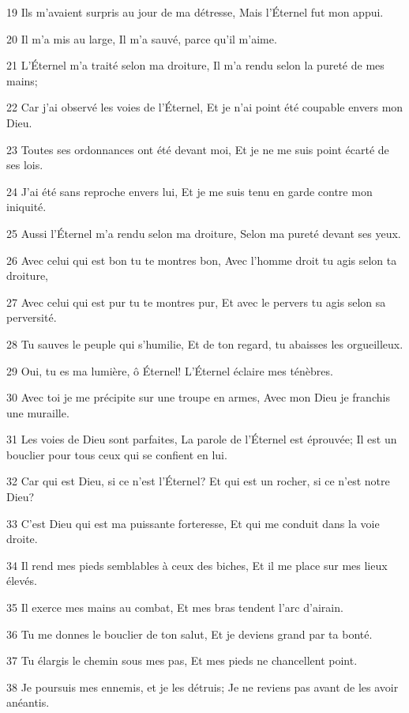 \par 19 Ils m'avaient surpris au jour de ma détresse, Mais l'Éternel fut mon appui.
\par 20 Il m'a mis au large, Il m'a sauvé, parce qu'il m'aime.
\par 21 L'Éternel m'a traité selon ma droiture, Il m'a rendu selon la pureté de mes mains;
\par 22 Car j'ai observé les voies de l'Éternel, Et je n'ai point été coupable envers mon Dieu.
\par 23 Toutes ses ordonnances ont été devant moi, Et je ne me suis point écarté de ses lois.
\par 24 J'ai été sans reproche envers lui, Et je me suis tenu en garde contre mon iniquité.
\par 25 Aussi l'Éternel m'a rendu selon ma droiture, Selon ma pureté devant ses yeux.
\par 26 Avec celui qui est bon tu te montres bon, Avec l'homme droit tu agis selon ta droiture,
\par 27 Avec celui qui est pur tu te montres pur, Et avec le pervers tu agis selon sa perversité.
\par 28 Tu sauves le peuple qui s'humilie, Et de ton regard, tu abaisses les orgueilleux.
\par 29 Oui, tu es ma lumière, ô Éternel! L'Éternel éclaire mes ténèbres.
\par 30 Avec toi je me précipite sur une troupe en armes, Avec mon Dieu je franchis une muraille.
\par 31 Les voies de Dieu sont parfaites, La parole de l'Éternel est éprouvée; Il est un bouclier pour tous ceux qui se confient en lui.
\par 32 Car qui est Dieu, si ce n'est l'Éternel? Et qui est un rocher, si ce n'est notre Dieu?
\par 33 C'est Dieu qui est ma puissante forteresse, Et qui me conduit dans la voie droite.
\par 34 Il rend mes pieds semblables à ceux des biches, Et il me place sur mes lieux élevés.
\par 35 Il exerce mes mains au combat, Et mes bras tendent l'arc d'airain.
\par 36 Tu me donnes le bouclier de ton salut, Et je deviens grand par ta bonté.
\par 37 Tu élargis le chemin sous mes pas, Et mes pieds ne chancellent point.
\par 38 Je poursuis mes ennemis, et je les détruis; Je ne reviens pas avant de les avoir anéantis.
